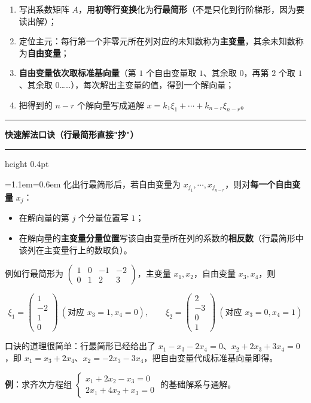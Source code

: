 \documentclass[11pt,openany,UTF8]{ctexbook}
\newcommand{\callouthead}[2]{%
  \par\addvspace{7pt}\noindent
  {\color{#1}\rule[-0.15em]{3pt}{1.05em}}\hspace{0.5em}%
  {\bfseries\color{#1}#2}\par\nobreak\vspace{-0.35em}%
  {\color{rulesep}\hrule height 0.4pt}\nobreak\vspace{0.45em}%
  \begingroup\small\setlength{\parindent}{0pt}%
  \leftskip=1.1em\rightskip=0.6em\noindent\ignorespaces}
\newcommand{\calloutend}{\par\endgroup\addvspace{7pt}}
\newenvironment{callkey}[1]{\callouthead{keybar}{#1}}{\calloutend}
\begin{document}
\begin{enumerate}
\item 写出系数矩阵 $A$，用\textbf{初等行变换}化为\textbf{行最简形}（不是只化到行阶梯形，因为要读出解）；
\item 定位主元：每行第一个非零元所在列对应的未知数称为\textbf{主变量}，其余未知数称为\textbf{自由变量}；
\item \textbf{自由变量依次取标准基向量}（第 $1$ 个自由变量取 $1$、其余取 $0$，再第 $2$ 个取 $1$、其余取 $0$……），每次解出主变量的值，得到一个解向量；
\item 把得到的 $n-r$ 个解向量写成通解 $x=k_1\xi_1+\cdots+k_{n-r}\xi_{n-r}$。
\end{enumerate}
\begin{callkey}{快速解法口诀（行最简形直接"抄"）}
化出行最简形后，若自由变量为 $x_{j_1},\cdots,x_{j_{n-r}}$，则对\textbf{每一个自由变量} $x_{j}$：

\begin{itemize}
\item 在解向量的第 $j$ 个分量位置写 $1$；
\item 在解向量的\textbf{主变量分量位置}写该自由变量所在列的系数的\textbf{相反数}（行最简形中该列在主变量行上的数取负）。
\end{itemize}
例如行最简形为 $\begin{pmatrix}1 & 0 & -1 & -2 \\ 0 & 1 & 2 & 3\end{pmatrix}$，主变量 $x_1,x_2$，自由变量 $x_3,x_4$，则

\[\xi_1=\begin{pmatrix} 1 \\ -2 \\ 1 \\ 0 \end{pmatrix}\ (\text{对应 }x_3=1,x_4=0),\qquad
\xi_2=\begin{pmatrix} 2 \\ -3 \\ 0 \\ 1 \end{pmatrix}\ (\text{对应 }x_3=0,x_4=1)\]

口诀的道理很简单：行最简形已经给出了 $x_1-x_3-2x_4=0$、$x_2+2x_3+3x_4=0$，即 $x_1=x_3+2x_4$、$x_2=-2x_3-3x_4$，把自由变量代成标准基向量即得。

\end{callkey}

\textbf{例}：求齐次方程组 $\begin{cases} x_1+2x_2-x_3=0 \\ 2x_1+4x_2+x_3=0 \end{cases}$ 的基础解系与通解。
\end{document}
